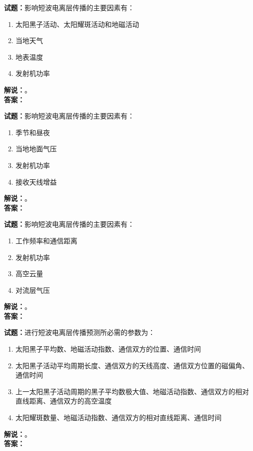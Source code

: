 \documentclass{ctexbook}
\begin{document}
\bigskip

\noindent\textbf{试题：}影响短波电离层传播的主要因素有：
\begin{enumerate}[leftmargin=3em]
  \item 太阳黑子活动、太阳耀斑活动和地磁活动
  \item 当地天气
  \item 地表温度
  \item 发射机功率
\end{enumerate}
\noindent\textbf{解说：}\textbf{}。\\\noindent\textbf{答案：}

\bigskip

\noindent\textbf{试题：}影响短波电离层传播的主要因素有：
\begin{enumerate}[leftmargin=3em]
  \item 季节和昼夜
  \item 当地地面气压
  \item 发射机功率
  \item 接收天线增益
\end{enumerate}
\noindent\textbf{解说：}\textbf{}。\\\noindent\textbf{答案：}

\bigskip

\noindent\textbf{试题：}影响短波电离层传播的主要因素有：
\begin{enumerate}[leftmargin=3em]
  \item 工作频率和通信距离
  \item 发射机功率
  \item 高空云量
  \item 对流层气压
\end{enumerate}
\noindent\textbf{解说：}\textbf{}。\\\noindent\textbf{答案：}

\bigskip

\noindent\textbf{试题：}进行短波电离层传播预测所必需的参数为：
\begin{enumerate}[leftmargin=3em]
  \item 太阳黑子平均数、地磁活动指数、通信双方的位置、通信时间
  \item 太阳黑子活动平均周期长度、通信双方的天线高度、通信双方位置的磁偏角、通信时间
  \item 上一太阳黑子活动周期的黑子平均数极大值、地磁活动指数、通信双方的相对直线距离、通信双方的高空温度
  \item 太阳耀斑数量、地磁活动指数、通信双方的相对直线距离、通信时间
\end{enumerate}
\noindent\textbf{解说：}\textbf{}。\\\noindent\textbf{答案：}
\end{document}
